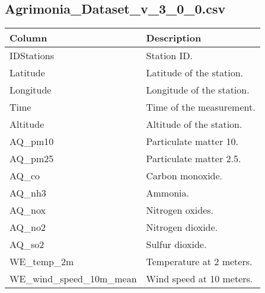 \documentclass[11pt,a4paper]{article}
\begin{document}
\subsection{Agrimonia\_Dataset\_v\_3\_0\_0.csv}
\begin{table}[H]
    \centering
    \begin{tabular}{|l|l|}
        \hline
        \hline
        \textbf{Column}                 & \textbf{Description}                                            \\
        \hline
        IDStations                      & Station ID.                                                     \\
        Latitude                        & Latitude of the station.                                        \\
        Longitude                       & Longitude of the station.                                       \\
        Time                            & Time of the measurement.                                        \\
        Altitude                        & Altitude of the station.                                        \\
        AQ\_pm10                        & Particulate matter 10.                                          \\
        AQ\_pm25                        & Particulate matter 2.5.                                         \\
        AQ\_co                          & Carbon monoxide.                                                \\
        AQ\_nh3                         & Ammonia.                                                        \\
        AQ\_nox                         & Nitrogen oxides.                                                \\
        AQ\_no2                         & Nitrogen dioxide.                                               \\
        AQ\_so2                         & Sulfur dioxide.                                                 \\
        WE\_temp\_2m                    & Temperature at 2 meters.                                        \\
        WE\_wind\_speed\_10m\_mean      & Wind speed at 10 meters.                                        \\

\end{tabular}
\end{table}
\end{document}
